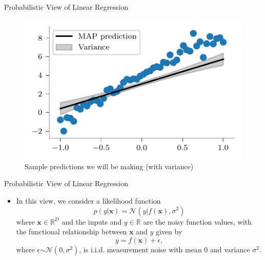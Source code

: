 \documentclass{beamer}
\begin{document}
\begin{frame}{Probabilistic View of Linear Regression}
\begin{figure}
	\centering
	\includegraphics{../../notebooks/bayesian-linear-posterior-predictions}
	\caption{Sample predictions we will be making (with variance)}
	\label{fig:bayesian-linear-dataset}
\end{figure}

\end{frame}

\begin{frame}{Probabilistic View of Linear Regression}
\begin{itemize}[<+->]
	\item  In this view, we consider a likelihood function
	\begin{equation*}
	p(y | \boldsymbol{x})=\mathcal{N}\left(y | f(\boldsymbol{x}), \sigma^{2}\right)
	\end{equation*}
	where $\boldsymbol{x} \in \mathbb{R}^{D}$ and the inputs and $y \in \mathbb{R}$ are the noisy function values, with the functional relationship between $\boldsymbol{x}$ and $y$ given by 
	\begin{equation*}
	y = f(\boldsymbol{x}) + \epsilon,
	\end{equation*} where $\epsilon \stackrel{}{\sim} \mathcal{N}(0, \sigma^{2})$, is i.i.d. measurement noise with mean 0 and variance $\sigma^{2}$.
	
\end{itemize}
\end{frame}
\end{document}
